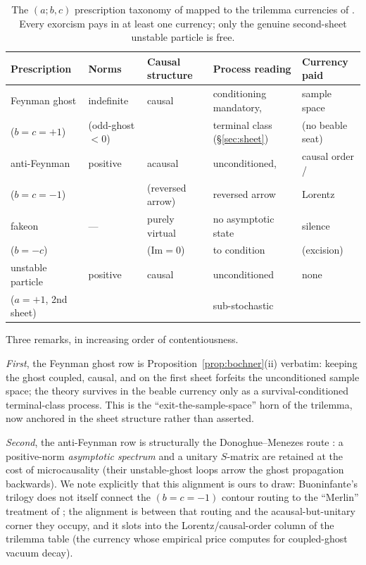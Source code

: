 \documentclass[11pt]{article}
\theoremstyle{definition}
\theoremstyle{remark}
\begin{document}
\begin{table}[ht]
\centering
\footnotesize
\begin{tabular}{lllll}
\toprule
Prescription & Norms & Causal structure & Process reading &
Currency paid \\
\midrule
Feynman ghost & indefinite & causal &
conditioning mandatory, & sample space \\
($b=c=+1$) & (odd-ghost $<0$) & &
terminal class (\S\ref{sec:sheet}) &
(no beable seat) \\[3pt]
anti-Feynman & positive & acausal &
unconditioned, & causal order / \\
($b=c=-1$) & & (reversed arrow) &
reversed arrow & Lorentz \\[3pt]
fakeon & --- & purely virtual &
no asymptotic state & silence \\
($b=-c$) & & ($\mathrm{Im}=0$) & to condition &
(excision) \\[3pt]
unstable particle & positive & causal &
unconditioned & none \\
($a=+1$, 2nd sheet) & & & sub-stochastic & \\
\bottomrule
\end{tabular}
\caption{The $(a;b,c)$ prescription taxonomy of
\cite{BuoninfanteP1} mapped to the trilemma currencies of
\cite{choosing}. Every exorcism pays in at least one currency; only
the genuine second-sheet unstable particle is free.}
\label{tab:taxonomy}
\end{table}

Three remarks, in increasing order of contentiousness.

\emph{First}, the Feynman ghost row is
Proposition~\ref{prop:bochner}(ii) verbatim: keeping the ghost
coupled, causal, and on the first sheet forfeits the unconditioned
sample space; the theory survives in the beable currency only as a
survival-conditioned terminal-class process. This is the
``exit-the-sample-space'' horn of the trilemma, now anchored in the
sheet structure rather than asserted.

\emph{Second}, the anti-Feynman row is structurally the
Donoghue--Menezes route \cite{DonoghueMenezes}: a positive-norm
\emph{asymptotic spectrum} and a
unitary $S$-matrix are retained at the cost of microcausality (their
unstable-ghost loops arrow the ghost propagation backwards). We note
explicitly that this alignment is ours to draw: Buoninfante's trilogy
does not itself connect the $(b=c=-1)$ contour routing to the
``Merlin'' treatment of \cite{DonoghueMenezes}; the alignment is
between that routing and
the acausal-but-unitary corner they occupy,
and it slots into the Lorentz/causal-order column of the trilemma
table (the currency whose empirical price \cite{instantaneous}
computes for coupled-ghost vacuum decay).
\end{document}
